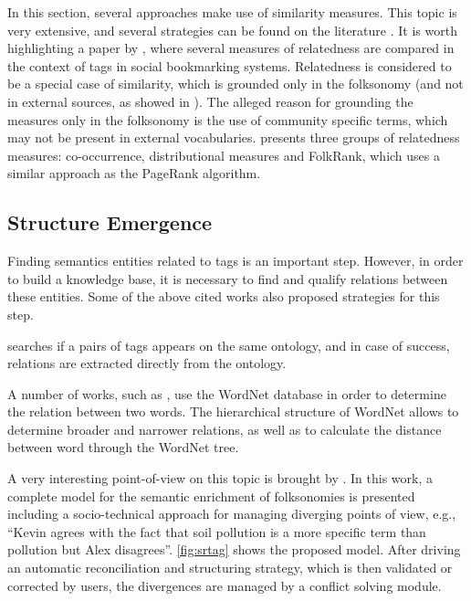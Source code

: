 In this section, several approaches make use of similarity measures.
This topic is very extensive, and several strategies can be found on the literature \cite{Harispe2015, Harispe2014, Trillo2007, Cilibrasi2007}.
It is worth highlighting a paper by , where several measures of relatedness are compared in the context of tags in social bookmarking systems.
Relatedness is considered to be a special case of similarity, which is grounded only in the folksonomy (and not in external sources, as showed in ).
The alleged reason for grounding the measures only in the folksonomy is the use of community specific terms, which may not be present in external vocabularies.
 presents three groups of relatedness measures: co-occurrence, distributional measures and FolkRank, which uses a similar approach as the PageRank algorithm.



\subsection{Structure Emergence}
\label{sec:emergence}

Finding semantics entities related to tags is an important step.
However, in order to build a knowledge base, it is necessary to find and qualify relations between these entities.
Some of the above cited works also proposed strategies for this step.

 searches if a pairs of tags appears on the same ontology, and in case of success, relations are extracted directly from the ontology.

A number of works, such as \cite{Limpens2013}, use the WordNet database in order to determine the relation between two words.
The hierarchical structure of WordNet allows to determine broader and narrower relations, as well as to calculate the distance between word through the WordNet tree.

A very interesting point-of-view on this topic is brought by .
In this work, a complete model for the semantic enrichment of folksonomies is presented including a socio-technical approach for managing diverging points of view, e.g., ``Kevin agrees with the fact that soil pollution is a more specific term than pollution but Alex disagrees''.
\autoref{fig:srtag} shows the proposed model.
After driving an automatic reconciliation and structuring strategy, which is then validated or corrected by users, the divergences are managed by a conflict solving module.

